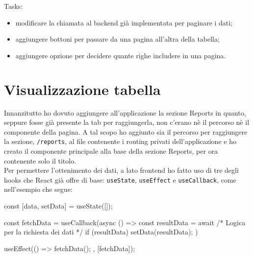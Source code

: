 \noindent Tasks:

\begin{itemize}
  \item modificare la chiamata al backend già implementata per paginare i dati;
  \item aggiungere bottoni per passare da una pagina all'altra della tabella;
  \item aggiungere opzione per decidere quante righe includere in una pagina.
\end{itemize}

\section{Visualizzazione tabella}
\noindent Innanzitutto ho dovuto aggiungere all'applicazione la sezione Reports in quanto, seppure fosse già presente la tab per raggiungerla, non c'erano nè il percorso nè il componente della pagina.
A tal scopo ho aggiunto sia il percorso per raggiungere la sezione, \texttt{/reports}, al file contenente i routing privati dell'applicazione e ho creato il componente principale alla base della sezione Reports, per ora contenente solo il titolo.\\
Per permettere l'ottenimento dei dati, a lato frontend ho fatto uso di tre degli hooks che React già offre di base: \texttt{useState}, \texttt{useEffect} e \texttt{useCallback}, come nell'esempio che segue: \\
\begin{code}[frame=tb,title={Esempio di fetch dati da backend e memorizzazione in React state}]
  const [data, setData] = useState([]);

  const fetchData = useCallback(async () => {
    const resultData = await
    /* Logica per la richiesta dei dati */
    if (resultData) {
      setData(resultData);
    }
  })

  useEffect(() => {
    fetchData();
  }, [fetchData]);
\end{code}\\\\

